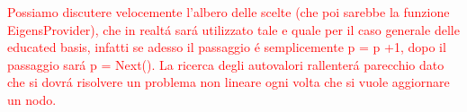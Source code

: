 \textcolor{red}{Possiamo discutere velocemente l'albero delle scelte (che poi sarebbe la funzione EigensProvider), che in realt\'a sar\'a utilizzato tale e quale per il caso generale delle educated basis, infatti se adesso il passaggio \'e semplicemente p = p +1, dopo il passaggio sar\'a p = Next().
La ricerca degli autovalori rallenter\'a parecchio dato che si dovr\'a risolvere un problema non lineare ogni volta che si vuole aggiornare un nodo.}